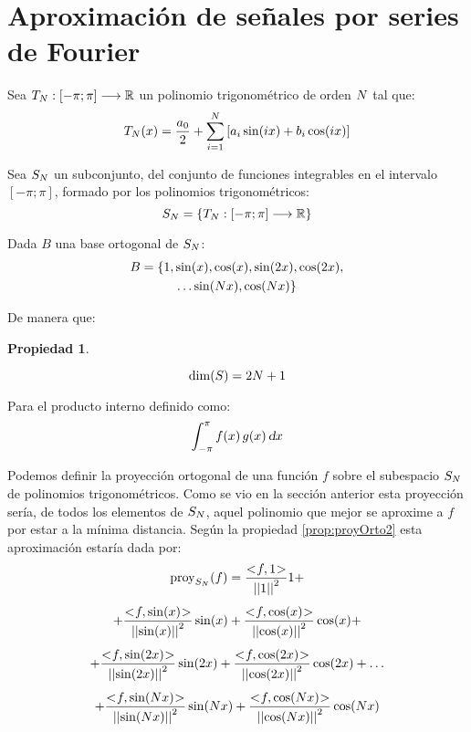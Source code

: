 \documentclass[a5paper,12pt,twoside]{book}
\newtheorem{prop}{{Propiedad}}[chapter]
\begin{document}
\section{Aproximación de señales por series de Fourier}

Sea $T_N: \left[-\pi;\pi\right] \longrightarrow \mathbb{R}$ un polinomio trigonométrico de orden $N$ tal que:
\begin{equation*}
    T_N(x) = \frac{a_0}{2} + \sum_{i=1}^N \left[ a_i \sin(i x) + b_i \cos(i x) \right]
\end{equation*}

Sea $S_N$ un subconjunto, del conjunto de funciones integrables en el intervalo $[-\pi;\pi]$, formado por los polinomios trigonométricos:
\begin{equation*}
    S_N = { \left\{ {T_N: \left[-\pi;\pi\right] \longrightarrow \mathbb{R}} \right\} }
\end{equation*}

Dada $B$ una base ortogonal de $S_N$:
\begin{multline*}
    B = \{ 1 , \sin(x) , \cos(x) , \sin(2x) , \cos(2x) ,
    \\
    \dots \sin(N x) , \cos(N x) \}
\end{multline*}

De manera que:

\begin{mdframed}[style=MyFrame1]
    \begin{prop}
    \end{prop}
    \begin{equation*}
        \operatorname{dim}(S) = 2 N + 1
    \end{equation*}
\end{mdframed}

Para el producto interno definido como:
\begin{equation*}
    \int_{-\pi}^\pi f(x) \, g(x) \, \textsl{d} x
\end{equation*}

Podemos definir la proyección ortogonal de una función $f$ sobre el subespacio $S_N$ de polinomios trigonométricos. Como se vio en la sección anterior esta proyección sería, de todos los elementos de $S_N$, aquel polinomio que mejor se aproxime a $f$ por estar a la mínima distancia. Según la propiedad \ref{prop:proyOrto2} esta aproximación estaría dada por:
\begin{multline*}
    \proy_{S_\Nth}(f) = \frac{\intProd{f}{1}}{\nnorm{1}^2} 1 +
    \\[1ex]
    + \frac{\intProd{f}{\sin(x)}}{\nnorm{\sin(x)}^2} \sin(x) + \frac{\intProd{f}{\cos(x)}}{\nnorm{\cos(x)}^2} \cos(x) +
    \\[1ex]
    + \frac{\intProd{f}{\sin(2x)}}{\nnorm{\sin(2x)}^2} \sin(2x) + \frac{\intProd{f}{\cos(2x)}}{\nnorm{\cos(2x)}^2} \cos(2x) + \dots
    \\[1ex]
    + \frac{\intProd{f}{\sin(\Nth x)}}{\nnorm{\sin(\Nth x)}^2} \sin(\Nth x) + \frac{\intProd{f}{\cos(\Nth x)}}{\nnorm{\cos(\Nth x)}^2} \cos(\Nth x)
\end{multline*}
\end{document}
